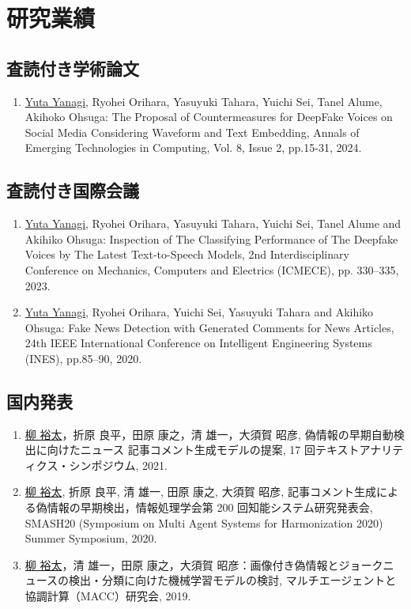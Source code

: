 \chapter*{研究業績}
\section{査読付き学術論文}
\begin{enumerate}
    \item \underline{Yuta Yanagi}, Ryohei Orihara, Yasuyuki Tahara, Yuichi Sei, Tanel Alume, Akihoko Ohsuga: The Proposal of Countermeasures for DeepFake Voices on Social Media Considering Waveform and Text Embedding, Annals of Emerging Technologies in Computing, Vol. 8, Issue 2, pp.15-31, 2024.
\end{enumerate}

\section{査読付き国際会議}
\begin{enumerate}
    \item \underline{Yuta Yanagi}, Ryohei Orihara, Yasuyuki Tahara, Yuichi Sei, Tanel Alume and Akihiko Ohsuga: Inspection of The Classifying Performance of The Deepfake Voices by The Latest Text-to-Speech Models, 2nd Interdisciplinary Conference on Mechanics, Computers and Electrics (ICMECE), pp. 330–335, 2023.
    \item \underline{Yuta Yanagi}, Ryohei Orihara, Yuichi Sei, Yasuyuki Tahara and Akihiko Ohsuga: Fake News Detection with Generated Comments for News Articles, 24th IEEE International Conference on Intelligent Engineering Systems (INES), pp.85–90, 2020.
\end{enumerate}

\section{国内発表}
\begin{enumerate}
    \item \underline{柳 裕太}，折原 良平，田原 康之，清 雄一，大須賀 昭彦, 偽情報の早期自動検出に向けたニュース 記事コメント生成モデルの提案, 17 回テキストアナリティクス・シンポジウム, 2021.
    \item \underline{柳 裕太}, 折原 良平, 清 雄一, 田原 康之, 大須賀 昭彦, 記事コメント生成による偽情報の早期検出，情報処理学会第 200 回知能システム研究発表会, SMASH20 (Symposium on Multi Agent Systems for Harmonization 2020) Summer Symposium, 2020.
    \item \underline{柳 裕太}，清 雄一，田原 康之，大須賀 昭彦：画像付き偽情報とジョークニュースの検出・分類に向けた機械学習モデルの検討, マルチエージェントと協調計算（MACC）研究会, 2019. 
\end{enumerate}
